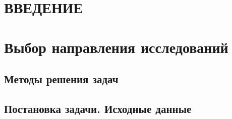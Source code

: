 \section*{ВВЕДЕНИЕ}

\section{Выбор направления исследований}

\subsection{Методы решения задач}

\subsection{Постановка задачи. Исходные данные}
